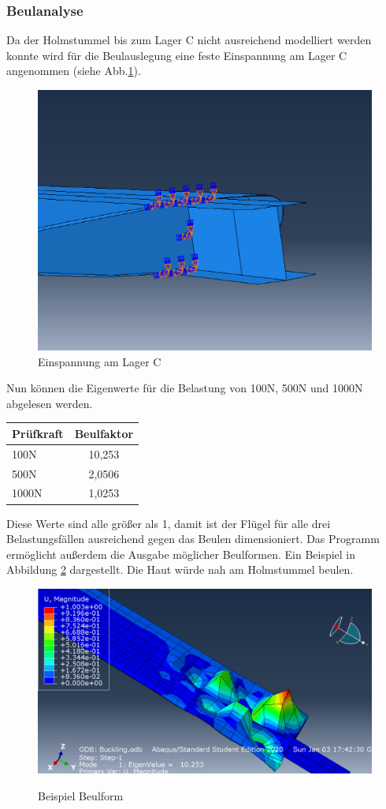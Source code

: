 \subsubsection{Beulanalyse}
Da der Holmstummel bis zum Lager C nicht ausreichend modelliert werden konnte wird für die Beulauslegung eine feste Einspannung am Lager C angenommen (siehe Abb.\ref{BEinspannung}).
\begin{figure}[h]
 \centering
 \includegraphics[scale=0.4]{Bilder/Beuleinspannung}
 \caption{Einspannung am Lager C}
 \label{BEinspannung}
\end{figure}
\noindent
Nun können die Eigenwerte für die Belastung von 100N, 500N und 1000N abgelesen werden.
\begin{center}
\begin{tabular}[h]{l|c}
Prüfkraft&Beulfaktor\\
\hline
100N&10,253\\
500N&2,0506\\
1000N&1,0253\\
\end{tabular}
\end{center}
\noindent
Diese Werte sind alle größer als 1, damit ist der Flügel für alle drei Belastungsfällen ausreichend gegen das Beulen dimensioniert.
Das Programm ermöglicht außerdem die Ausgabe möglicher Beulformen. Ein Beispiel in Abbildung \ref{Beulform} dargestellt. Die Haut würde nah am Holmstummel beulen. 
\begin{figure}[h]
 \centering
 \includegraphics[scale=0.4]{Bilder/Beulen100N}
 \label{Beulform}
 \caption{Beispiel Beulform}
\end{figure}
\newpage

 

  
